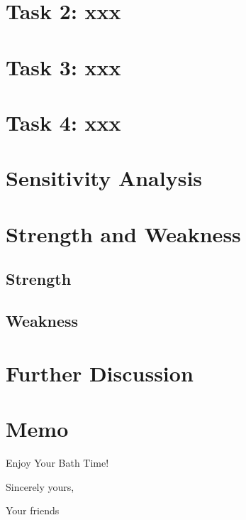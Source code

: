 \documentclass{mcmthesis}
\begin{document}
\section{Task 2: xxx}

\section{Task 3: xxx}

\section{Task 4: xxx}

\section{Sensitivity Analysis}

\section{Strength and Weakness}
\subsection{Strength}
\subsection{Weakness}

\section{Further Discussion}



\newpage
\section*{Memo} %

\begin{letter}{Enjoy Your Bath Time!}


\vspace{\parskip}

Sincerely yours,

Your friends

\end{letter}
\end{document}
